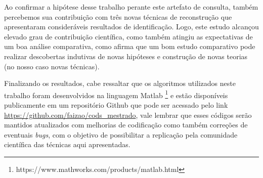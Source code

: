 Ao confirmar a hipótese desse trabalho perante este artefato de consulta, também percebemos sua contribuição com três novas técnicas de reconstrução que apresentaram consideráveis resultados de identificação. Logo, este estudo alcançou elevado grau de contribuição científica, como também atingiu as expectativas de um boa análise comparativa, como afirma  que um bom estudo comparativo pode realizar descobertas indutivas de novas hipóteses e construção de novas teorias (no nosso caso novas técnicas).


Finalizando os resultados, cabe ressaltar que os algoritmos utilizados neste trabalho foram desenvolvidos na linguagem Matlab \footnote{https://www.mathworks.com/products/matlab.html} e estão disponíveis publicamente em um repositório Github que pode ser acessado pelo link \url{https://github.com/faizao/cods_mestrado}, vale lembrar que esses códigos serão mantidos atualizados com melhorias de codificação como também correções de eventuais \textit{bugs}, com o objetivo de possibilitar a replicação pela comunidade científica das técnicas aqui apresentadas.
